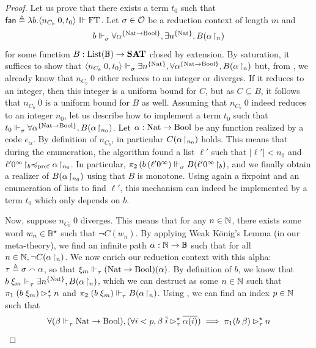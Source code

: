 \documentclass[a4paper,UKenglish,cleveref, autoref, thm-restate]{lipics-v2021}
\begin{document}
\begin{proof}
  Let us prove that there exists a term $t_0$ such that $\mathsf{fan} \triangleq \lambda b. \langle n_{C_b}\;0 , t_0\rangle \Vvdash\mathrm{FT}$. Let $\sigma\in\mathcal O$ be a reduction context of length $m$ and
  \[b \Vdash_{\sigma}^{} \forall \alpha^{\{\mathrm{Nat} \to \mathrm{Bool}\}}, \exists n^{\{\mathrm{Nat}\}}, B({\alpha}\!\upharpoonright_{n})\]
  for some function $B : \mathrm{List}(\mathbb B) \to {\mathbf{SAT}}$ closed by extension. By saturation, it suffices to show that
  $\langle n_{C_b}\;0 , t_0\rangle \Vdash_{\sigma}^{} \exists n^{\{\mathrm{Nat}\}}, \forall \alpha^{\{\mathrm{Nat} \to \mathrm{Bool}\}}, B({\alpha}\!\upharpoonright_{n})$
  but, from , we already know that $n_{C_b}\;0$ either reduces to an integer or diverges.  If it reduces to an integer, then this integer is a uniform bound for $C$, but as $C \subseteq B$, it follows that $n_{C_b}\;0$ is a uniform bound for $B$ as well.
  Assuming that $n_{C_b}\;0$ indeed reduces to an integer $n_0$, let us describe how to implement a term $t_0$ such that $t_0 \Vdash_{\sigma}^{} \forall \alpha^{\{\mathrm{Nat} \to \mathrm{Bool}\}}, B({\alpha}\!\upharpoonright_{n_0})$. Let $\alpha:\mathrm{Nat}\to\mathrm{Bool}$ be any function realized by a code $e_\alpha$. By definition of $n_{C_b}$, in particular $C({\alpha}\!\upharpoonright_{n_0})$ holds. This means that during the enumeration, the algorithm found a list $\ell'$ such that $|\ell'|<n_0$ and ${\ell'0^\infty}\!\upharpoonright_{b} \preccurlyeq_{\mathrm{pref}} {\alpha}\!\upharpoonright_{n_0}$.
  In particular, $\pi_2\,(b\,({\ell'0^\infty})\Vdash_{\sigma}^{}B({\ell'0^\infty}\!\upharpoonright_{b})$, and we finally obtain a realizer of $B({\alpha}\!\upharpoonright_{n_0} )$ using that $B$ is monotone. Using again a fixpoint and an enumeration of lists to find $\ell'$, this mechanism can indeed be implemented by a term $t_0$ which only depends on $b$.

  Now, suppose $n_{C_b}\;0$ diverges. This means that for any $n \in \mathbb N$, there exists some word $w_n \in \mathbb B^\star$ such that $\lnot C(w_n)$. By applying Weak König's Lemma (in our meta-theory), we find an infinite path
  $\alpha : \mathbb N \to \mathbb B$
  such that for all $n \in \mathbb N, \lnot C({\alpha}\!\upharpoonright_{n})$. We now enrich our reduction context with this alpha:
  $\tau \triangleq \sigma \smallfrown \alpha$,
  so that $\xi_m \Vdash_{\tau}^{} (\mathrm{Nat} \to \mathrm{Bool})(\alpha)$. By definition of $b$, we know that
  $b\;\xi_m\Vdash_{\tau}^{} \exists n^{\{\mathrm{Nat}\}}, B({\alpha}\!\upharpoonright_{n})$,
  which we can destruct as some $n \in \mathbb N$ such that
  $\pi_1\;(b\;\xi_m) \rhd^{\star}_{\tau} n$ and $\pi_2\;(b\;\xi_m)\Vdash_{\tau}^{} B({\alpha}\!\upharpoonright_{n})$.
  Using , we can find an index $p\in \mathbb N$ such that
  \[\forall (\beta \Vdash_{\tau}^{} \mathrm{Nat} \to \mathrm{Bool}), (\forall i < p, \beta\;\overline i \rhd^{\star}_{\tau} \overline{\alpha(i)}) \implies \pi_1(b\;\beta) \rhd^{\star}_{\tau} n\]


\end{proof}
\end{document}
